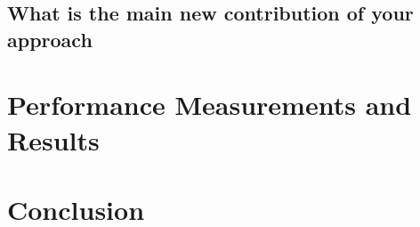 \documentclass{llncs}
\begin{document}
\subsection{What is the main new contribution of your approach}



\section{Performance Measurements and Results}

\section{Conclusion}



\end{document}
